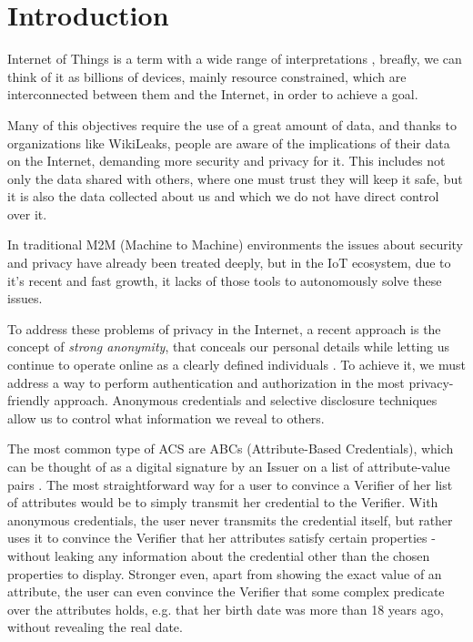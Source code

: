 \section{Introduction}

Internet of Things is a term with a wide range of interpretations \cite{Atzori20102787}, breafly, we can think of it as billions of devices, mainly resource constrained, which are interconnected between them and the Internet, in order to achieve a goal.

Many of this objectives require the use of a great amount of data, and thanks to organizations like WikiLeaks, people are aware of the implications of their data on the Internet, demanding more security and privacy for it. This includes not only the data shared with others, where one must trust they will keep it safe, but it is also the data collected about us and which we do not have direct control over it.

In traditional M2M (Machine to Machine) environments the issues about security and privacy have already been treated deeply, but in the IoT ecosystem, due to it's recent and fast growth, it lacks of those tools to autonomously solve these issues.

To address these problems of privacy in the Internet, a recent approach is the concept of \textit{strong anonymity}, that conceals our personal details while letting us continue to operate online as a clearly defined individuals \cite{stronganonymity}. To achieve it, we must address a way to perform authentication and authorization in the most privacy-friendly approach. Anonymous credentials and selective disclosure techniques allow us to control what information we reveal to others.

The most common type of ACS are ABCs (Attribute-Based Credentials), which can be thought of as a digital signature by an Issuer on a list of attribute-value pairs \cite{introCredIBM}.
The most straightforward way for a user to convince a Verifier of her list of attributes would be to simply transmit her credential to the Verifier.
With anonymous credentials, the user never transmits the credential itself, but rather uses it to convince the Verifier that her attributes satisfy certain properties - without leaking any information about the credential other than the chosen properties to display. 
Stronger even, apart from showing the exact value of an attribute, the user can even convince the
Verifier that some complex predicate over the attributes holds, e.g. that her birth date was more than 18 years ago, without revealing the real date.

